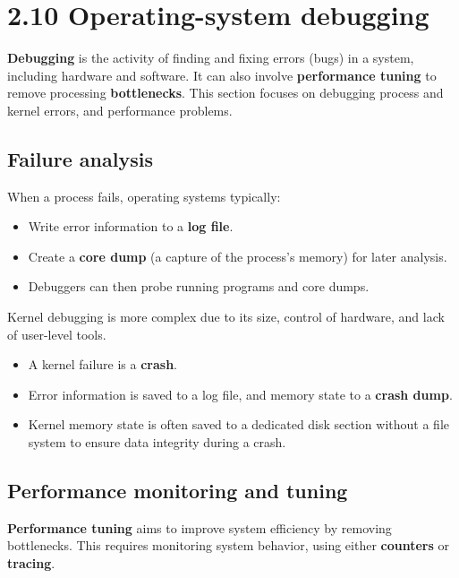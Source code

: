 \section*{2.10 Operating-system debugging}

\textbf{Debugging} is the activity of finding and fixing errors (bugs) in a system, including hardware and software. It can also involve \textbf{performance tuning} to remove processing \textbf{bottlenecks}. This section focuses on debugging process and kernel errors, and performance problems.

\subsection*{Failure analysis}
When a process fails, operating systems typically:
\begin{itemize}
    \item Write error information to a \textbf{log file}.
    \item Create a \textbf{core dump} (a capture of the process's memory) for later analysis.
    \item Debuggers can then probe running programs and core dumps.
\end{itemize}
Kernel debugging is more complex due to its size, control of hardware, and lack of user-level tools.
\begin{itemize}
    \item A kernel failure is a \textbf{crash}.
    \item Error information is saved to a log file, and memory state to a \textbf{crash dump}.
    \item Kernel memory state is often saved to a dedicated disk section without a file system to ensure data integrity during a crash.
\end{itemize}

\subsection*{Performance monitoring and tuning}
\textbf{Performance tuning} aims to improve system efficiency by removing bottlenecks. This requires monitoring system behavior, using either \textbf{counters} or \textbf{tracing}.

